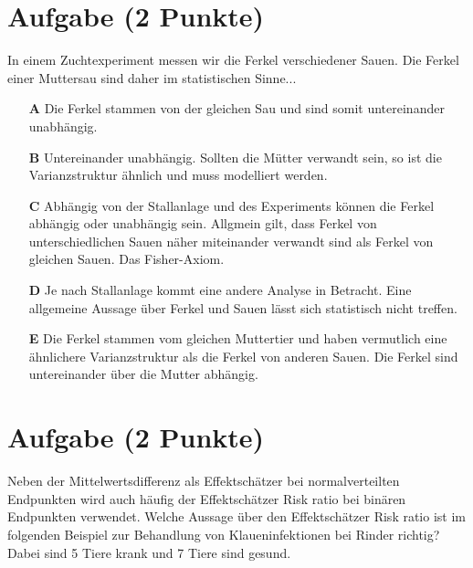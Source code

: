 \documentclass[a4paper, 9pt]{scrartcl}\usepackage[]{graphicx}\usepackage[]{xcolor}
\begin{document}
\section{Aufgabe \hfill (2 Punkte)}



In einem Zuchtexperiment messen wir die Ferkel verschiedener Sauen. Die Ferkel einer Muttersau sind daher im statistischen Sinne...



\begin{enumerate}
\item [\textbf{A} \msquare] Die Ferkel stammen von der gleichen Sau und sind somit untereinander unabhängig.
\item [\textbf{B} \msquare] Untereinander unabhängig. Sollten die Mütter verwandt sein, so ist die Varianzstruktur ähnlich und muss modelliert werden.
\item [\textbf{C} \msquare] Abhängig von der Stallanlage und des Experiments können die Ferkel abhängig oder unabhängig sein. Allgmein gilt, dass Ferkel von unterschiedlichen Sauen näher miteinander verwandt sind als Ferkel von gleichen Sauen. Das Fisher-Axiom.
\item [\textbf{D} \msquare] Je nach Stallanlage kommt eine andere Analyse in Betracht. Eine allgemeine Aussage über Ferkel und Sauen lässt sich statistisch nicht treffen.
\item [\textbf{E} \msquare] Die Ferkel stammen vom gleichen Muttertier und haben vermutlich eine ähnlichere Varianzstruktur als die Ferkel von anderen Sauen. Die Ferkel sind untereinander über die Mutter abhängig.
\end{enumerate}

\section{Aufgabe \hfill (2 Punkte)}



Neben der Mittelwertsdifferenz als Effektschätzer bei normalverteilten Endpunkten wird auch häufig der Effektschätzer Risk ratio bei binären Endpunkten verwendet. Welche Aussage über den Effektschätzer Risk ratio ist im folgenden Beispiel zur Behandlung von Klaueninfektionen bei Rinder richtig? Dabei sind 5 Tiere krank und 7 Tiere sind gesund.
\end{document}
